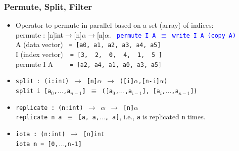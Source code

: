 \documentclass{beamer}
\newcommand{\blue}[1]{\textcolor{Blue}{{#1}}}
\renewcommand{\emph}[1]{\textcolor{structure}{#1}}
\newcommand{\emp}[1]{\textcolor{DikuRed}{ #1}}
\begin{document}
\begin{frame}[fragile,t]
  \frametitle{Permute, Split, Filter}

\begin{itemize}
    \item Operator to \emph{permute in parallel} based on a set (array) of indices:\\
          \emph{permute : [n]int$\rightarrow$[n]$\alpha$$\rightarrow$[n]$\alpha$}. 
          {\small~\blue{\tt permute~I~A~$\equiv$~write~I~A~(copy~A)}}\\
           A (data vector) {\tt~= [a0,~a1,~a2,~a3,~a4,~a5]}\\
           I (index vector){\tt~~= [3,~~2,~~0,~~4,~~1,~~5~]}\\
           \emp{permute I A     {\tt~~~~= [a2,~a4,~a1,~a0,~a3,~a5]}}\\\bigskip
           
    \item %
          \emph{\tt split : (i:int) $\rightarrow$ [n]$\alpha$ $\rightarrow$ ([i]$\alpha$,[n-i]$\alpha$)}\\
          \emp{\tt split i [a$_0$,$\ldots$,a$_{n-1}$] $\equiv$ ([a$_0$,$\ldots$,a$_{i-1}$], [a$_i$,$\ldots$,a$_{n-1}$])}\smallskip

    \item \emph{\tt replicate : (n:int) $\rightarrow$ $\alpha$ $\rightarrow$ [n]$\alpha$}\\
            \emp{\tt replicate n a $\equiv$ [a, a,$\ldots$, a]}, i.e., {\tt a} is replicated {\tt n} times.\smallskip

    \item \emph{\tt iota : (n:int) $\rightarrow$ [n]int}\\
             \emp{\tt iota n = [0,$\ldots$,n-1]}
\end  {itemize}

\end{frame}
\end{document}
